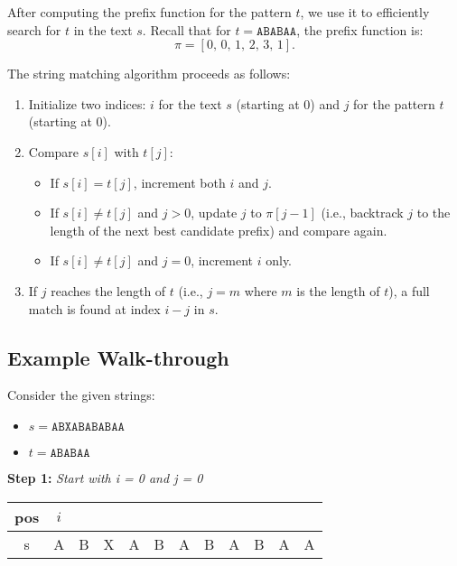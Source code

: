 After computing the prefix function for the pattern \( t \), we use it to efficiently search for \( t \) in the text \( s \). Recall that for \( t = \texttt{ABABAA} \), the prefix function is:
\[
\pi = [0,\, 0,\, 1,\, 2,\, 3,\, 1].
\]

The string matching algorithm proceeds as follows:

\begin{enumerate}
    \item Initialize two indices: \( i \) for the text \( s \) (starting at 0) and \( j \) for the pattern \( t \) (starting at 0).
    \item Compare \( s[i] \) with \( t[j] \):
    \begin{itemize}
        \item If \( s[i] = t[j] \), increment both \( i \) and \( j \).
        \item If \( s[i] \neq t[j] \) and \( j > 0 \), update \( j \) to \( \pi[j-1] \) (i.e., backtrack \( j \) to the length of the next best candidate prefix) and compare again.
        \item If \( s[i] \neq t[j] \) and \( j = 0 \), increment \( i \) only.
    \end{itemize}
    \item If \( j \) reaches the length of \( t \) (i.e., \( j = m \) where \( m \) is the length of \( t \)), a full match is found at index \( i - j \) in \( s \).
\end{enumerate}

\subsection*{Example Walk-through}
Consider the given strings:
\begin{itemize}
    \item \( s = \texttt{ABXABABABAA} \)
    \item \( t = \texttt{ABABAA} \)
\end{itemize}
\textbf{Step 1: }\textit{Start with i = 0 and j = 0}

\begin{table}[H]
\centering
\begin{tabular}{|c|c|c|c|c|c|c|c|c|c|c|c|}
\hline
pos   &$i$&   &   &   &   &   &   &   &   &   &   \\ \hline
s     & A & B & X & A & B & A & B & A & B & A & A \\ \hline
\end{tabular}
\end{table}

